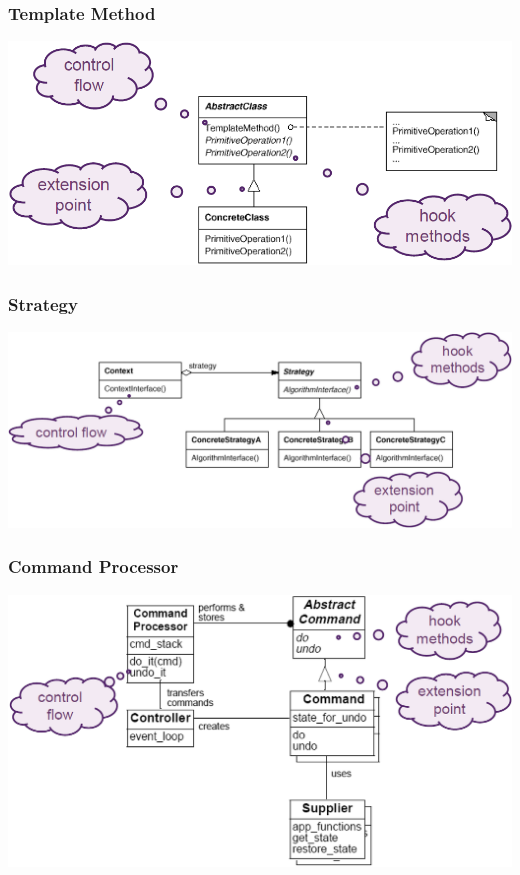 \subsubsection{Template Method}
\includegraphics[width=\linewidth]{./img/template_method_example.png}
\subsubsection{Strategy}
\includegraphics[width=\linewidth]{./img/strategy_example.png}
\subsubsection{Command Processor}
\includegraphics[width=\linewidth]{./img/command_processor_example.png}
